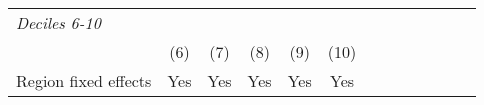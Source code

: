 \documentclass[a4paper,12pt]{article}
\begin{document}
\date{}
\thispagestyle{empty}


\begin{table}[H]
\footnotesize
\centering

\begin{tabular}{l*{6}{cc}}
\hline
\hline
\hspace{-0.2cm}\textit{Deciles 6-10}\\
&\multicolumn{1}{c}{(6)}&\multicolumn{1}{c}{(7)}                    &\multicolumn{1}{c}{(8)}&\multicolumn{1}{c}{(9)} &\multicolumn{1}{c}{(10)} \\

Region fixed effects  &\multicolumn{1}{c}{Yes}   &\multicolumn{1}{c}{Yes}   &\multicolumn{1}{c}{Yes}   &\multicolumn{1}{c}{Yes} &\multicolumn{1}{c}{Yes}     \\
\hline
\hline
\end{tabular}
\end{table}
\end{document}
